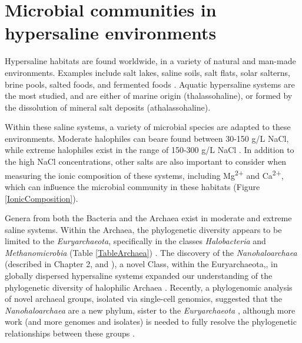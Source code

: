 
\section{Microbial communities in hypersaline environments}

Hypersaline habitats are found worldwide, in a variety of natural and man-made environments. Examples include salt lakes, saline soils, salt ﬂats, solar salterns, brine pools, salted foods, and fermented foods \cite{Oren:2002vw}. Aquatic hypersaline systems are the most studied, and are either of marine origin (thalassohaline), or formed by the dissolution of mineral salt deposits (athalassohaline). 

Within these saline systems, a variety of microbial species are adapted to these environments. Moderate halophiles can beare found between 30-150 g/L NaCl, while extreme halophiles exist in the range of 150-300 g/L NaCl  \cite{Andrei:2012he}. In addition to the high NaCl concentrations, other salts are also important to consider when measuring the ionic composition of these systems, including Mg\textsuperscript{2+} and Ca\textsuperscript{2+}, which can inßuence the microbial community in these habitats  \cite{McGenity:2000ts,Podell:2013fp} (Figure \ref{IonicComposition}).

Genera from both the Bacteria and the Archaea exist in moderate and extreme saline systems. Within the Archaea, the phylogenetic diversity appears to be limited to the \textit{Euryarchaeota}, specifically in the classes \textit{Halobacteria} and \textit{Methanomicrobia} (Table \ref{TableArchaea}) \cite{Ventosa:2012wo}. The discovery of the \textit{Nanohaloarchaea} (described in Chapter 2, and \cite{Narasingarao:2012kp}), a novel Class, within the Euryarchaeota,, in globally dispersed hypersaline systems expanded our understanding of the phylogenetic diversity of halophilic Archaea \cite{Narasingarao:2012kp}. Recently, a phylogenomic analysis of novel archaeal groups, isolated via single-cell genomics, suggested that the \textit{Nanohaloarchaea} are a new phylum, sister to the \textit{Euryarchaeota} \cite{Rinke:2013bt}, although more work (and more genomes and isolates) is needed to fully resolve the phylogenetic relationships between these groups \cite{Williams:um}.

